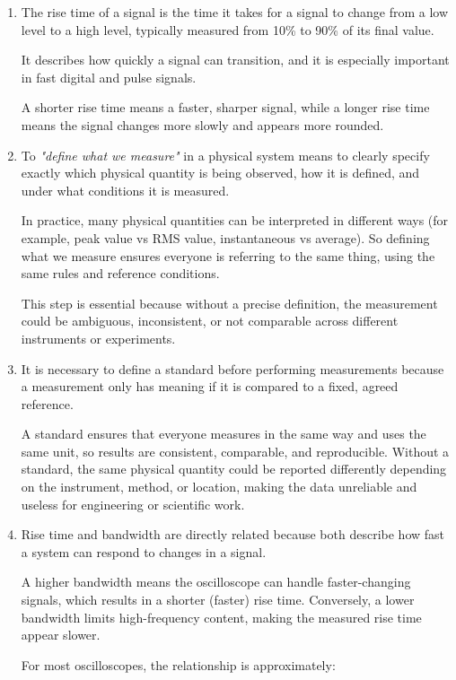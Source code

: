 \documentclass[../main.tex]{subfiles}
\begin{document}
\begin{enumerate}[label=\textbf{\arabic*.}]
	
	\item The rise time of a signal is the time it takes for a signal to change from a low level to a high level, typically measured from 10\% to 90\% of its final value.

	It describes how quickly a signal can transition, and it is especially important in fast digital and pulse signals.

	A shorter rise time means a faster, sharper signal, while a longer rise time means the signal changes more slowly and appears more rounded.

	
	
	\item To \textit{"define what we measure"} in a physical system means to clearly specify exactly which physical quantity is being observed, how it is defined, and under what conditions it is measured.

	In practice, many physical quantities can be interpreted in different ways (for example, peak value vs RMS value, instantaneous vs average). So defining what we measure ensures everyone is referring to the same thing, using the same rules and reference conditions.

	This step is essential because without a precise definition, the measurement could be ambiguous, inconsistent, or not comparable across different instruments or experiments.

	\item It is necessary to define a standard before performing measurements because a measurement only has meaning if it is compared to a fixed, agreed reference.

	A standard ensures that everyone measures in the same way and uses the same unit, so results are consistent, comparable, and reproducible. Without a standard, the same physical quantity could be reported differently depending on the instrument, method, or location, making the data unreliable and useless for engineering or scientific work.


	\item Rise time and bandwidth are directly related because both describe how fast a system can respond to changes in a signal.

	A higher bandwidth means the oscilloscope can handle faster-changing signals, which results in a shorter (faster) rise time. 
	Conversely, a lower bandwidth limits high-frequency content, making the measured rise time appear slower.

	For most oscilloscopes, the relationship is approximately:
	

\end{enumerate}
\end{document}
